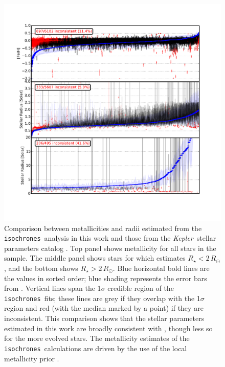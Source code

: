 \documentclass{emulateapj}
\newcommand{\figlabel}[1]{\label{fig:#1}}
\newcommand{\Tab}[1]{Table~\ref{tab:#1}}
\newcommand{\tab}[1]{\Tab{#1}}
\newcommand{\kepler}{\textit{Kepler}}
\newcommand{\isochrones}{\texttt{isochrones}}
\begin{document}
\begin{figure}[p]
\begin{center}
\includegraphics[width=7in]{figures/hubercompare_fehradius.pdf}
\end{center}
\caption{Comparison between metallicities and radii estimated from the
  \isochrones\ analysis in this work and those from the
  \kepler\ stellar parameters catalog \citep[][hereafter
    ]{Huber:2014}.  Top panel shows metallicity
  for all stars in the sample.  The middle panel shows stars for which
   estimates $R_\star < 2\,R_\odot$, and the
  bottom shows $R_\star > 2\,R_\odot$. Blue horizontal bold lines are
  the  values in sorted order; blue shading
  represents the error bars from .  Vertical
  lines span the 1$\sigma$ credible region of the \isochrones\ fits;
  these lines are grey if they overlap with the
   1$\sigma$ region and red (with the median
  marked by a point) if they are inconsistent.  This comparison shows
  that the stellar parameters estimated in this work are broadly
  consistent with , though less so for the more
  evolved stars.  The metallicity estimates of the
  \isochrones\ calculations are driven by the use of the local
  metallicity prior \citep[][\tab{priors}]{Hayden:2015,
    Casagrande:2011}.
\figlabel{starsfehradius}}
\end{figure}
\end{document}
